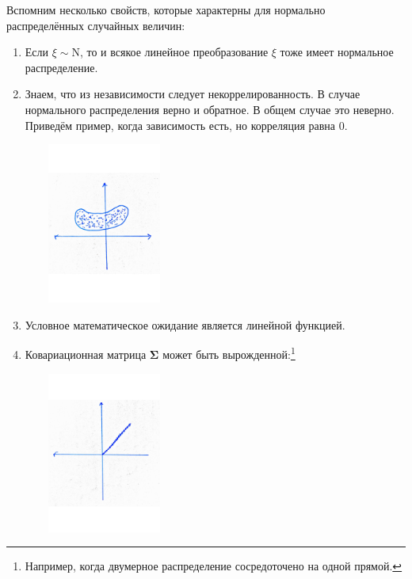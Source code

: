 \documentclass[specialist, 12pt,
subf, %
href, colorlinks=true,
substylefile = spbu.rtx,
]{disser}
\begin{document}
Вспомним несколько свойств, которые характерны для нормально распределённых случайных величин:
\begin{enumerate}
	\item Если $\xi \sim \mathrm{N}$, то и всякое линейное преобразование $\xi$ тоже имеет нормальное распределение.
	\item Знаем, что из независимости следует некоррелированность. В случае нормального распределения верно и обратное.
	В общем случае это неверно. Приведём пример, когда зависимость есть, но корреляция равна 0.
	\begin{center}
		\begin{minipage}{0.51\linewidth}
			\centering
			\includegraphics[width=150pt, height=150pt]{p07}
		\end{minipage}
	\end{center}
	\item Условное математическое ожидание является линейной функцией.
	\item Ковариационная матрица $\bm\Sigma$ может быть вырожденной:\footnote{Например, когда двумерное распределение сосредоточено на одной прямой.}
	\begin{center}
		\begin{minipage}{0.4\linewidth}
			\centering
			\includegraphics[width=150pt, height=150pt]{p08}
		\end{minipage}
	\end{center}
	
\end{enumerate}
\end{document}
